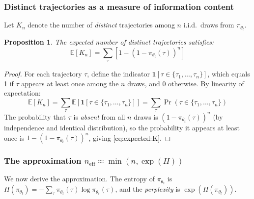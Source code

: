 \documentclass[11pt,a4paper]{article}
\newcommand{\E}{\mathbb{E}}
\newcommand{\neff}{n_{\mathrm{eff}}}
\newcommand{\pith}{\pi_{\theta_t}}
\newtheorem{proposition}{Proposition}
\begin{document}
\subsubsection{Distinct trajectories as a measure of information content}

Let $K_n$ denote the number of \emph{distinct} trajectories among $n$ i.i.d.\ draws from $\pith$.

\begin{proposition}
  \label{prop:distinct}
  The expected number of distinct trajectories satisfies:
  \begin{equation}
    \E[K_n] = \sum_{\tau} \left[1 - (1 - \pith(\tau))^n\right]
    \label{eq:expected-K}
  \end{equation}
\end{proposition}

\begin{proof}
  For each trajectory $\tau$, define the indicator $\mathbf{1}[\tau \in \{\tau_1,\ldots,\tau_n\}]$,
  which equals 1 if $\tau$ appears at least once among the $n$ draws, and 0 otherwise.
  By linearity of expectation:
  \begin{equation}
    \E[K_n] = \sum_\tau \E\!\left[\mathbf{1}[\tau \in \{\tau_1,\ldots,\tau_n\}]\right]
             = \sum_\tau \Pr(\tau \in \{\tau_1,\ldots,\tau_n\})
  \end{equation}
  The probability that $\tau$ is \emph{absent} from all $n$ draws is
  $(1 - \pith(\tau))^n$ (by independence and identical distribution),
  so the probability it appears at least once is $1 - (1 - \pith(\tau))^n$, giving \eqref{eq:expected-K}.
\end{proof}

\subsubsection{The approximation $\neff \approx \min(n, \exp(H))$}
\label{sec:neff-approx}

We now derive the approximation.
The entropy of $\pith$ is $H(\pith) = -\sum_\tau \pith(\tau)\log\pith(\tau)$,
and the \emph{perplexity} is $\exp(H(\pith))$.
\end{document}
